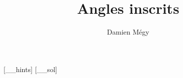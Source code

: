 



\def\bio{}


\newcommand{\deuxSecantes}{
\tkzDefPoint(0,0){O}
\tkzDrawCircle(O,A)
\tkzInterLL(B,C)(A,D)\tkzGetPoint{P}
\tkzDrawSegments(P,A P,B)
\tkzDrawPolygon[very thick](A,B,C,D)
}

\newcommand{\quatreSecantes}{
\tkzDefPoint(0,0){O}
\tkzDrawCircle(O,A)
\tkzInterLL(B,C)(A,D)\tkzGetPoint{P}
\tkzInterLL(A,B)(C,D)\tkzGetPoint{Q}
\tkzDrawSegments(P,C P,D Q,B Q,C)
\tkzDrawPolygon[very thick](A,B,C,D)
}




[_\jobname_hints]
[_\jobname_sol]


\title{Angles inscrits}
\author{Damien Mégy}
\maketitle

\avertissement 



\indications
\correction




